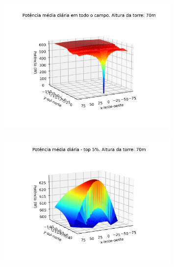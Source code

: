 \documentclass[12pt,notheorems,hyperref={pdfauthor= Rafael Nardi}]{beamer}
\begin{document}
\begin{frame}%
	\begin{figure}[htpb]
		\centering
		\includegraphics[width=0.8\textwidth]{../../plots/tower_shadow_correction/square_grid_along_day_70mfull_grid.png}
		\label{fig:heliost_field_average_60m}
	\end{figure}
\end{frame}

\begin{frame}%
	\begin{figure}[htpb]
		\centering
		\includegraphics[width=0.8\textwidth]{../../plots/tower_shadow_correction/square_grid_along_day_70mtop_5_most_powerfull.png}
		\label{fig:heliost_field_average_60m}
	\end{figure}
\end{frame}
\end{document}
